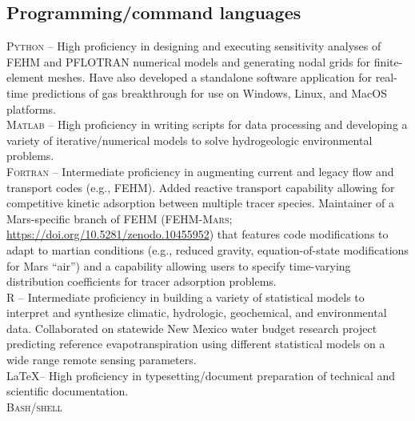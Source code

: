 \documentclass[11pt, letterpaper]{article}
\begin{document}
\subsection*{Programming/command languages}
\noindent
\textsc{Python} – High proficiency in designing and executing sensitivity
analyses of FEHM and PFLOTRAN numerical models and generating nodal grids for
finite-element meshes. Have also developed a standalone software application
for real-time predictions of gas breakthrough for use on Windows, Linux, and
MacOS platforms.\\[5pt]
\textsc{Matlab} – High proficiency in writing scripts for data processing and
developing a variety of iterative/numerical models to solve hydrogeologic
environmental problems.\\[5pt]
\textsc{Fortran} – Intermediate proficiency in augmenting current and legacy flow
and transport codes (e.g., \textsc{FEHM}). Added reactive transport capability
allowing for competitive kinetic adsorption between multiple tracer species.
Maintainer of a Mars-specific branch of \textsc{FEHM} (\textsc{FEHM-Mars};
\href{https://doi.org/10.5281/zenodo.10455952}{https://doi.org/10.5281/zenodo.10455952})
that features code modifications to adapt to martian conditions (e.g., reduced
gravity, equation-of-state modifications for Mars ``air'') and a capability
allowing users to specify time-varying distribution coefficients for tracer
adsorption problems.\\[5pt]
\textsc{R} – Intermediate proficiency in building a variety of statistical models
to interpret and synthesize climatic, hydrologic, geochemical, and
environmental data. Collaborated on statewide New Mexico water budget research
project predicting reference evapotranspiration using different statistical
models on a wide range remote sensing parameters.\\[5pt]
\LaTeX – High proficiency in typesetting/document preparation of technical and
scientific documentation. \\[5pt]
\textsc{Bash/shell}
\end{document}
